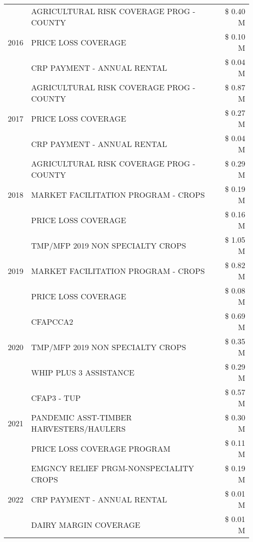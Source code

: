 \begin{tabular}{llr}
\cline{1-3}
\multirow[t]{3}{*}{2016} & AGRICULTURAL RISK COVERAGE PROG - COUNTY & \$ 0.40 M \\
 & PRICE LOSS COVERAGE & \$ 0.10 M \\
 & CRP PAYMENT - ANNUAL RENTAL & \$ 0.04 M \\
\cline{1-3}
\multirow[t]{3}{*}{2017} & AGRICULTURAL RISK COVERAGE PROG - COUNTY & \$ 0.87 M \\
 & PRICE LOSS COVERAGE & \$ 0.27 M \\
 & CRP PAYMENT - ANNUAL RENTAL & \$ 0.04 M \\
\cline{1-3}
\multirow[t]{3}{*}{2018} & AGRICULTURAL RISK COVERAGE PROG - COUNTY & \$ 0.29 M \\
 & MARKET FACILITATION PROGRAM - CROPS & \$ 0.19 M \\
 & PRICE LOSS COVERAGE & \$ 0.16 M \\
\cline{1-3}
\multirow[t]{3}{*}{2019} & TMP/MFP 2019 NON SPECIALTY CROPS & \$ 1.05 M \\
 & MARKET FACILITATION PROGRAM - CROPS & \$ 0.82 M \\
 & PRICE LOSS COVERAGE & \$ 0.08 M \\
\cline{1-3}
\multirow[t]{3}{*}{2020} & CFAPCCA2 & \$ 0.69 M \\
 & TMP/MFP 2019 NON SPECIALTY CROPS & \$ 0.35 M \\
 & WHIP PLUS 3 ASSISTANCE & \$ 0.29 M \\
\cline{1-3}
\multirow[t]{3}{*}{2021} & CFAP3 - TUP & \$ 0.57 M \\
 & PANDEMIC ASST-TIMBER HARVESTERS/HAULERS & \$ 0.30 M \\
 & PRICE LOSS COVERAGE PROGRAM & \$ 0.11 M \\
\cline{1-3}
\multirow[t]{3}{*}{2022} & EMGNCY RELIEF PRGM-NONSPECIALITY CROPS & \$ 0.19 M \\
 & CRP PAYMENT - ANNUAL RENTAL & \$ 0.01 M \\
 & DAIRY MARGIN COVERAGE & \$ 0.01 M \\
\cline{1-3}
\bottomrule
\end{tabular}
